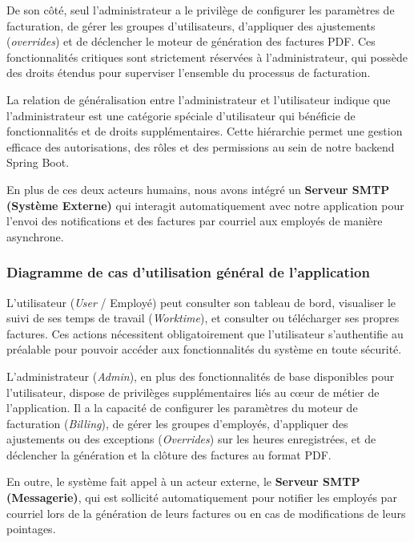 \documentclass[12pt, a4paper, openany]{report}
\begin{document}
De son côté, seul l'administrateur a le privilège de configurer les paramètres de facturation, de gérer les groupes d'utilisateurs, d'appliquer des ajustements (\textit{overrides}) et de déclencher le moteur de génération des factures PDF. Ces fonctionnalités critiques sont strictement réservées à l'administrateur, qui possède des droits étendus pour superviser l'ensemble du processus de facturation.

La relation de généralisation entre l'administrateur et l'utilisateur indique que l'administrateur est une catégorie spéciale d'utilisateur qui bénéficie de fonctionnalités et de droits supplémentaires. Cette hiérarchie permet une gestion efficace des autorisations, des rôles et des permissions au sein de notre backend Spring Boot.

En plus de ces deux acteurs humains, nous avons intégré un \textbf{Serveur SMTP (Système Externe)} qui interagit automatiquement avec notre application pour l'envoi des notifications et des factures par courriel aux employés de manière asynchrone.

\vspace{-0.5cm}

\subsubsection{Diagramme de cas d'utilisation général de l'application}

\vspace{-0.4cm}
L'utilisateur (\textit{User} / Employé) peut consulter son tableau de bord, visualiser le suivi de ses temps de travail (\textit{Worktime}), et consulter ou télécharger ses propres factures. Ces actions nécessitent obligatoirement que l'utilisateur s'authentifie au préalable pour pouvoir accéder aux fonctionnalités du système en toute sécurité.

L'administrateur (\textit{Admin}), en plus des fonctionnalités de base disponibles pour l'utilisateur, dispose de privilèges supplémentaires liés au cœur de métier de l'application. Il a la capacité de configurer les paramètres du moteur de facturation (\textit{Billing}), de gérer les groupes d'employés, d'appliquer des ajustements ou des exceptions (\textit{Overrides}) sur les heures enregistrées, et de déclencher la génération et la clôture des factures au format PDF.

En outre, le système fait appel à un acteur externe, le \textbf{Serveur SMTP (Messagerie)}, qui est sollicité automatiquement pour notifier les employés par courriel lors de la génération de leurs factures ou en cas de modifications de leurs pointages.
\end{document}
